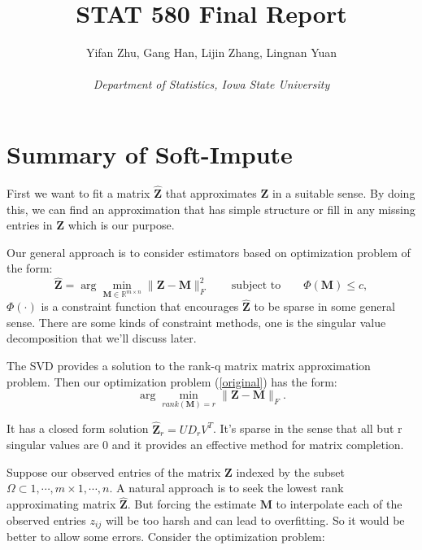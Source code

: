 \documentclass{article}
\begin{document}
	

	
	\title{\bf STAT 580 Final Report}
	\author{Yifan Zhu, Gang Han, Lijin Zhang, Lingnan Yuan\\ \  \\ \textit{Department of Statistics, Iowa State University}}
	\date{}
	\maketitle
	
	\section{Summary of Soft-Impute}
First we want to fit a matrix $\widehat{\mathbf{Z}}$ that approximates $\mathbf{Z}$ in a suitable sense. By doing this, we can find an approximation that has simple structure or fill in any missing entries in $\mathbf{Z}$ which is our purpose.\cite{hastie2015statistical}

Our general approach is to consider estimators based on optimization problem of the form:
\begin{equation}\label{original}
\widehat{\mathbf{Z}}= \arg \min_{\mathbf{M}\in \mathbb{R}^{m\times n}} \| \mathbf{Z} - \mathbf{M} \|^2_F \qquad \textrm{subject to} \qquad\Phi(\mathbf{M})\le c,
\end{equation}
$\Phi(\cdot)$ is a constraint function that encourages $\hat{\mathbf{Z}}$ to be sparse in some general sense. There are some kinds of constraint methods, one is the singular value decomposition that we'll discuss later.

The SVD provides a solution to the rank-q matrix matrix approximation problem. Then our optimization problem (\ref{original}) has the form:
\begin{equation}
\arg\min_{rank(\mathbf{M}) = r} \| \mathbf{Z} - \mathbf{M} \|_F.
\end{equation}

It has a closed form solution $\widehat{\mathbf{Z}}_r = UD_rV^T$. It's sparse in the sense that all but r singular values are 0 and it provides an effective method for matrix completion.

Suppose our observed entries of the matrix $\mathbf{Z}$ indexed by the subset $\Omega \subset {1,\cdots,m}\times {1,\cdots,n}$. A natural approach is to seek the lowest rank approximating matrix $\widehat{\mathbf{Z}}$.
But forcing the estimate $\mathbf{M}$ to interpolate each of the observed entries $z_{ij}$ will be too harsh and can lead to overfitting. So it would be better to allow some errors. Consider the optimization problem:
\end{document}
